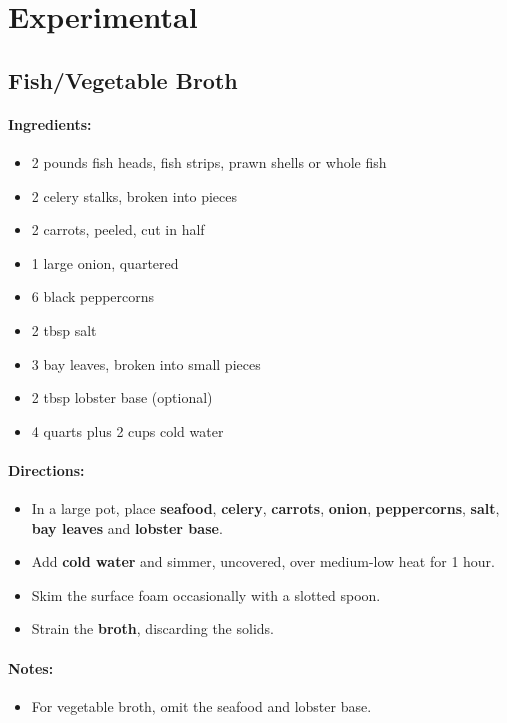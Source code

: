 \documentclass{article}
\begin{document}
\section{Experimental}


\subsection{Fish/Vegetable Broth}

\paragraph{Ingredients:}
\begin{itemize}
    \item 2 pounds fish heads, fish strips, prawn shells or whole fish
    \item 2 celery stalks, broken into pieces
    \item 2 carrots, peeled, cut in half
    \item 1 large onion, quartered
    \item 6 black peppercorns
    \item 2 tbsp salt
    \item 3 bay leaves, broken into small pieces
    \item 2 tbsp lobster base (optional)
    \item 4 quarts plus 2 cups cold water
\end{itemize}

\paragraph{Directions:}
\begin{itemize}
    \item In a large pot, place \textbf{seafood}, \textbf{celery}, \textbf{carrots}, \textbf{onion}, \textbf{peppercorns}, \textbf{salt}, \textbf{bay leaves} and \textbf{lobster base}.
    \item Add \textbf{cold water} and simmer, uncovered, over medium-low heat for 1 hour.
    \item Skim the surface foam occasionally with a slotted spoon.
    \item Strain the \textbf{broth}, discarding the solids.
\end{itemize}

\paragraph{Notes:}
\begin{itemize}
    \item For vegetable broth, omit the seafood and lobster base.
\end{itemize}
\end{document}
